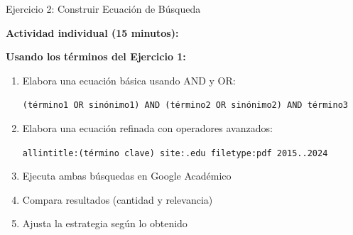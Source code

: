 \documentclass[11pt,aspectratio=169]{beamer}
\begin{document}

\begin{frame}{Ejercicio 2: Construir Ecuación de Búsqueda}

	\textbf{Actividad individual (15 minutos):}


	\textbf{Usando los términos del Ejercicio 1:}

	\begin{enumerate}
		\item Elabora una ecuación básica usando AND y OR:

		      \vspace{0.2cm}
		      \small
		      \texttt{(término1 OR sinónimo1) AND (término2 OR sinónimo2) AND término3}

		      \vspace{0.3cm}

		\item Elabora una ecuación refinada con operadores avanzados:

		      \vspace{0.2cm}
		      \texttt{allintitle:(término clave) site:.edu filetype:pdf 2015..2024}

		      \vspace{0.3cm}

		\item Ejecuta ambas búsquedas en Google Académico

		\item Compara resultados (cantidad y relevancia)

		\item Ajusta la estrategia según lo obtenido
	\end{enumerate}
\end{frame}

\end{document}
